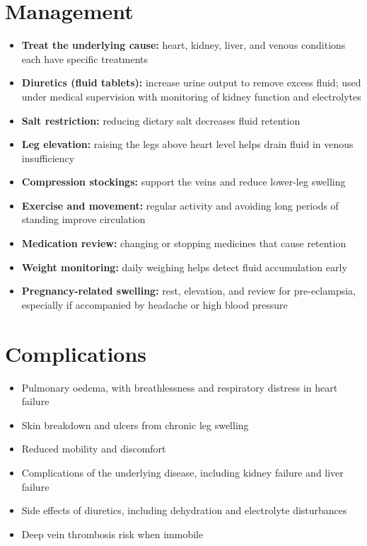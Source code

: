 \section*{Management}
\begin{itemize}
    \item \textbf{Treat the underlying cause:} heart, kidney, liver, and venous conditions each have specific treatments
    \item \textbf{Diuretics (fluid tablets):} increase urine output to remove excess fluid; used under medical supervision with monitoring of kidney function and electrolytes
    \item \textbf{Salt restriction:} reducing dietary salt decreases fluid retention
    \item \textbf{Leg elevation:} raising the legs above heart level helps drain fluid in venous insufficiency
    \item \textbf{Compression stockings:} support the veins and reduce lower-leg swelling
    \item \textbf{Exercise and movement:} regular activity and avoiding long periods of standing improve circulation
    \item \textbf{Medication review:} changing or stopping medicines that cause retention
    \item \textbf{Weight monitoring:} daily weighing helps detect fluid accumulation early
    \item \textbf{Pregnancy-related swelling:} rest, elevation, and review for pre-eclampsia, especially if accompanied by headache or high blood pressure
\end{itemize}

\section*{Complications}
\begin{itemize}
    \item Pulmonary oedema, with breathlessness and respiratory distress in heart failure
    \item Skin breakdown and ulcers from chronic leg swelling
    \item Reduced mobility and discomfort
    \item Complications of the underlying disease, including kidney failure and liver failure
    \item Side effects of diuretics, including dehydration and electrolyte disturbances
    \item Deep vein thrombosis risk when immobile
\end{itemize}

